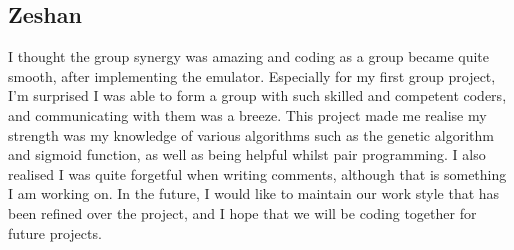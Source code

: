 \documentclass{article}
\begin{document}
\subsection{Zeshan}
I thought the group synergy was amazing and coding as a group became quite smooth, after implementing the emulator. Especially for my first group project, I'm surprised I was able to form a group with such skilled and competent coders, and communicating with them was a breeze. This project made me realise my strength was my knowledge of various algorithms such as the genetic algorithm and sigmoid function, as well as being helpful whilst pair programming. I also realised I was quite forgetful when writing comments, although that is something I am working on. In the future, I would like to maintain our work style that has been refined over the project, and I hope that we will be coding together for future projects.
\end{document}
